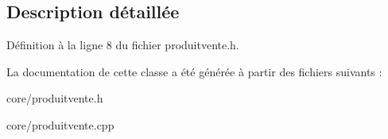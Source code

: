 \subsection{Description détaillée}


Définition à la ligne 8 du fichier produitvente.h.



La documentation de cette classe a été générée à partir des fichiers suivants :\begin{DoxyCompactItemize}
\item 
core/produitvente.h\item 
core/produitvente.cpp\end{DoxyCompactItemize}
